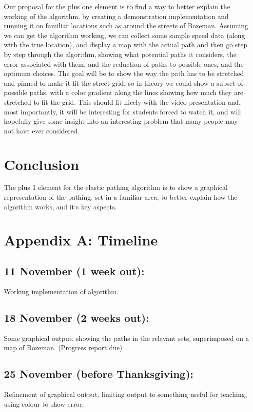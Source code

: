 \documentclass[11pt]{article}
\begin{document}
Our proposal for the plus one element is to find a way to better explain the working of the algorithm, by creating a demonstration implementation and running it on familiar locations such as around the streets of Bozeman.  Assuming we can get the algorithm working, we can collect some sample speed data (along with the true location), and display a map with the actual path and then go step by step through the algorithm, showing what potential paths it considers, the error associated with them, and the reduction of paths to possible ones, and the optimum choices.  The goal will be to show the way the path has to be stretched and pinned to make it fit the street grid, so in theory we could show a subset of possible paths, with a color gradient along the lines showing how much they are stretched to fit the grid.
\newline
\newline
This should fit nicely with the video presentation and, most importantly, it will be interesting for students forced to watch it, and will hopefully give some insight into an interesting problem that many people may not have ever considered.

\section{Conclusion}

The plus 1 element for the elastic pathing algorithm is to show a graphical representation of the pathing, set in a familiar area, to better explain how the algorithm works, and it`s key aspects.

\section{Appendix A:  Timeline}

\subsection{11 November (1 week out):}
Working implementation of algorithm.

\subsection{18 November (2 weeks out):}
Some graphical output, showing the paths in the relevant sets, superimposed on a map of Bozeman.  (Progress report due)

\subsection{25 November (before Thanksgiving):}
Refinement of graphical output, limiting output to something useful for teaching, using colour to show error.
\end{document}
